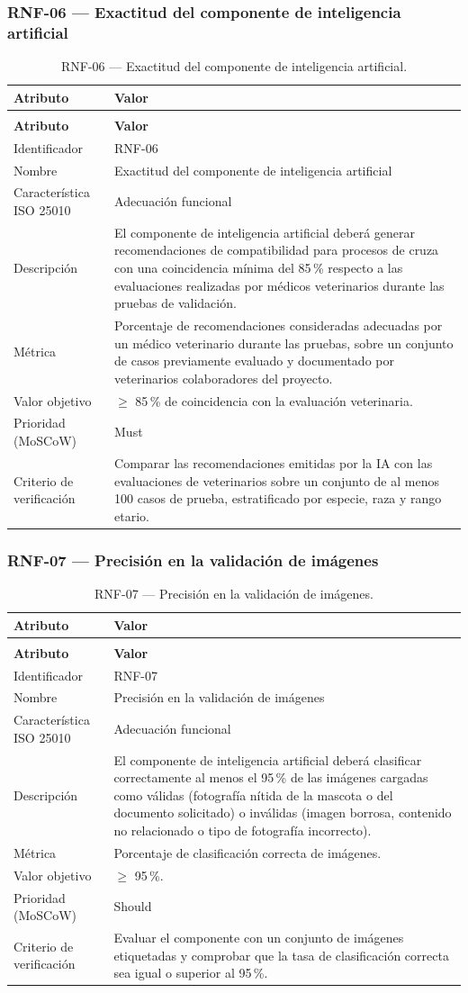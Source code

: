 \documentclass[journal,onecolumn]{IEEEtran}
\makeatletter
\newenvironment{atributos}[2]{%
	\small
	\begin{longtable}{@{}>{\raggedright\arraybackslash}p{4.2cm} >{\raggedright\arraybackslash}p{11.2cm}@{}}
		\caption{#2}\label{tab:#1}\\
		\toprule
		\textbf{Atributo} & \textbf{Valor} \\
		\midrule
		\endfirsthead
		\multicolumn{2}{@{}l}{\small\itshape (continuación)}\\
		\toprule
		\textbf{Atributo} & \textbf{Valor} \\
		\midrule
		\endhead
		\bottomrule
		\endlastfoot
	}{%
	\end{longtable}
	\normalsize
}
\makeatother
\begin{document}
	\subsubsection{RNF-06 --- Exactitud del componente de inteligencia artificial}
	
	\begin{atributos}{RNF-06}{RNF-06 --- Exactitud del componente de inteligencia artificial.}
		Identificador & RNF-06 \\
		Nombre & Exactitud del componente de inteligencia artificial \\
		Característica ISO 25010 & Adecuación funcional \\
		Descripción & El componente de inteligencia artificial deberá generar recomendaciones de compatibilidad para procesos de cruza con una coincidencia mínima del 85\,\% respecto a las evaluaciones realizadas por médicos veterinarios durante las pruebas de validación. \\
		Métrica & Porcentaje de recomendaciones consideradas adecuadas por un médico veterinario durante las pruebas, sobre un conjunto de casos previamente evaluado y documentado por veterinarios colaboradores del proyecto. \\
		Valor objetivo & $\geq$ 85\,\% de coincidencia con la evaluación veterinaria. \\
		Prioridad (MoSCoW) & Must \\
		Criterio de verificación & Comparar las recomendaciones emitidas por la IA con las evaluaciones de veterinarios sobre un conjunto de al menos 100 casos de prueba, estratificado por especie, raza y rango etario. \\
	\end{atributos}
	
	\subsubsection{RNF-07 --- Precisión en la validación de imágenes}
	
	\begin{atributos}{RNF-07}{RNF-07 --- Precisión en la validación de imágenes.}
		Identificador & RNF-07 \\
		Nombre & Precisión en la validación de imágenes \\
		Característica ISO 25010 & Adecuación funcional \\
		Descripción & El componente de inteligencia artificial deberá clasificar correctamente al menos el 95\,\% de las imágenes cargadas como válidas (fotografía nítida de la mascota o del documento solicitado) o inválidas (imagen borrosa, contenido no relacionado o tipo de fotografía incorrecto). \\
		Métrica & Porcentaje de clasificación correcta de imágenes. \\
		Valor objetivo & $\geq$ 95\,\%. \\
		Prioridad (MoSCoW) & Should \\
		Criterio de verificación & Evaluar el componente con un conjunto de imágenes etiquetadas y comprobar que la tasa de clasificación correcta sea igual o superior al 95\,\%. \\
	\end{atributos}
	
\end{document}
